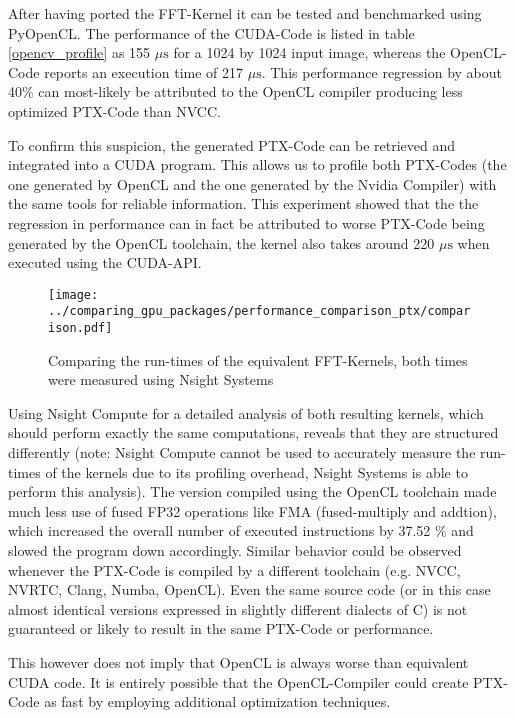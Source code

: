 \documentclass[english,11pt,a4paper,table]{article} %
\begin{document}
After having ported the FFT-Kernel it can be tested and benchmarked using PyOpenCL.
The performance of the CUDA-Code is listed in table \ref{opencv_profile} as 155  $\mu\text{s}$ for a 1024 by 1024 input image, whereas the OpenCL-Code reports an execution time of 217 $\mu\text{s}$.
This performance regression by about 40\% can most-likely be attributed to the OpenCL compiler producing less optimized PTX-Code than NVCC.

To confirm this suspicion, the generated PTX-Code can be retrieved and integrated into a CUDA program.
This allows us to profile both PTX-Codes (the one generated by OpenCL and the one generated by the Nvidia Compiler) with the same tools for reliable information.
This experiment showed that the the regression in performance can in fact be attributed to worse PTX-Code being generated by the OpenCL toolchain, the kernel also takes around 220 $\mu\text{s}$ when executed using the CUDA-API.

\begin{figure}[H]
	\centering
	\texttt{[image: ../comparing\_gpu\_packages/performance\_comparison\_ptx/comparison.pdf]}
	\caption{Comparing the run-times of the equivalent FFT-Kernels, both times were measured using Nsight Systems}
	\label{opencl-cuda-comparison}
\end{figure}

Using Nsight Compute for a detailed analysis of both resulting kernels, which should perform exactly the same computations, reveals that they are structured differently (note: Nsight Compute cannot be used to accurately measure the run-times of the kernels due to its profiling overhead, Nsight Systems is able to perform this analysis).
The version compiled using the OpenCL toolchain made much less use of fused FP32 operations like FMA (fused-multiply and addtion), which increased the overall number of executed instructions by 37.52 \% and slowed the program down accordingly.
Similar behavior could be observed whenever the PTX-Code is compiled by a different toolchain (e.g. NVCC, NVRTC, Clang, Numba, OpenCL).
Even the same source code (or in this case almost identical versions expressed in slightly different dialects of C) is not guaranteed or likely to result in the same PTX-Code or performance.

This however does not imply that OpenCL is always worse than equivalent CUDA code.
It is entirely possible that the OpenCL-Compiler could create PTX-Code as fast by employing additional optimization techniques.
\end{document}
